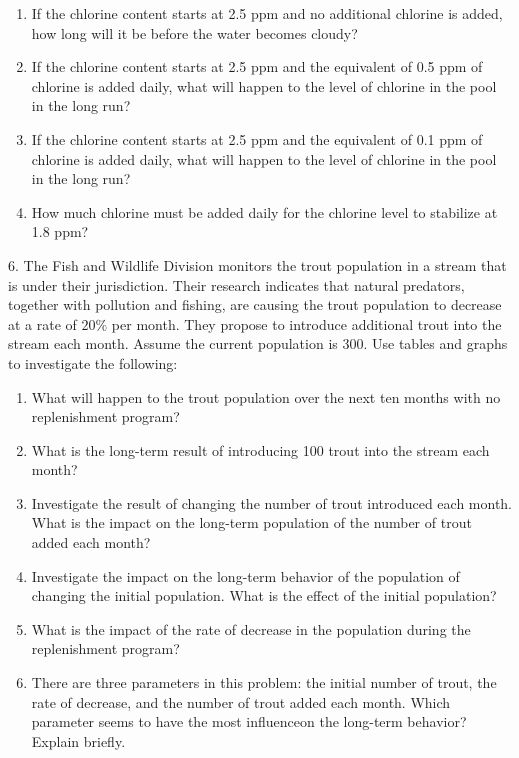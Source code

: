 \documentclass[10pt,]{book}
\theoremstyle{plain}
\theoremstyle{definition}
\theoremstyle{definition}
\theoremstyle{definition}
\numberwithin{equation}{section}
\begin{document}
\begin{exerciselist}
\begin{enumerate}[label=(\alph*)]
\item\hypertarget{li-21}{}If the chlorine content starts at 2.5 ppm and no additional chlorine is added, how long will it be before the water becomes cloudy?%
\item\hypertarget{li-22}{}If the chlorine content starts at 2.5 ppm and the equivalent of 0.5 ppm of chlorine is added daily, what will happen to the level of chlorine in the pool in the long run?%
\item\hypertarget{li-23}{}If the chlorine content starts at 2.5 ppm and the equivalent of 0.1 ppm of chlorine is added daily, what will happen to the level of chlorine in the pool in the long run?%
\item\hypertarget{li-24}{}How much chlorine must be added daily for the chlorine level to stabilize at 1.8 ppm?%
\end{enumerate}
%
\par\smallskip
\item[6.]\hypertarget{exercise-8}{}\hypertarget{p-26}{}%
The Fish and Wildlife Division monitors the trout population in a stream that is under their jurisdiction.  Their research indicates that natural predators, together with pollution and fishing, are causing the trout population to decrease at a rate of \(20\%\) per month.  They propose to introduce additional trout into the stream each month.  Assume the current population is 300.  Use tables and graphs to investigate the following: \leavevmode%
\begin{enumerate}[label=(\alph*)]
\item\hypertarget{li-25}{}What will happen to the trout population over the next ten months with no replenishment program?%
\item\hypertarget{li-26}{}What is the long-term result of introducing 100 trout into the stream each month?%
\item\hypertarget{li-27}{}Investigate the result of changing the number of trout introduced each month.  What is the impact on the long-term population of the number of trout added each month?%
\item\hypertarget{li-28}{}Investigate the impact on the long-term behavior of the population of changing the initial population.  What is the effect of the initial population?%
\item\hypertarget{li-29}{}What is the impact of the rate of decrease in the population during the replenishment program?%
\item\hypertarget{li-30}{}There are three parameters in this problem: the initial number of trout, the rate of decrease, and the number of trout added each month. Which parameter seems to have the most influenceon the long-term behavior? Explain briefly.%

\end{enumerate}
\end{exerciselist}
\end{document}
